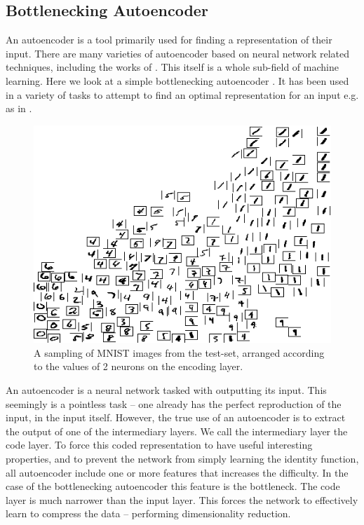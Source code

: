 \documentclass[12pt,parskip]{komatufte}
\begin{document}
\subsection{Bottlenecking Autoencoder}\label{sec:bottle-necking-autoencoder}

An autoencoder is a tool primarily used for finding a representation of their input.
There are many varieties of autoencoder based on neural network related techniques, including the works of \textcite{hinton2002RBM,hinton2006reducing,hinton2006fastDBN,vincent2010stacked,ICML2012Chen_416,2014VAE}.
This itself is a whole sub-field of machine learning.
Here we look at a simple bottlenecking autoencoder
\parencite{bourlard1988auto,japkowicz2000nonlinear}.
It has been used in a variety of tasks to attempt to find an optimal representation for an input e.g. as in .
\begin{figure}
	\caption{A sampling of MNIST images from the test-set, arranged according to the values of 2 neurons on the encoding layer.}
	\label{mnist-encoding}
	\includegraphics[width=\textwidth]{figs/chapterintromachinelearning/mnist-encoding.png}
\end{figure}
An autoencoder is a neural network tasked with outputting its input.
This seemingly is a pointless task -- one already has the perfect reproduction of the input, in the input itself.
However, the true use of an autoencoder is to extract the output of one of the intermediary layers.
We call the intermediary layer the code layer.
To force this coded representation to have useful interesting properties,
and to prevent the network from simply learning the identity function,
all autoencoder include one or more features that increases the difficulty.
In the case of the bottlenecking autoencoder this feature is the bottleneck.
The code layer is much narrower than the input layer.
This forces the network to effectively learn to compress the data -- performing dimensionality reduction.
\end{document}
